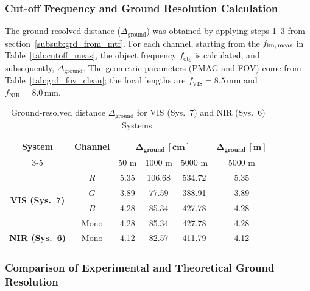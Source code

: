\subsubsection{Cut-off Frequency and Ground Resolution Calculation}
\label{subsub:grd_calc}
\noindent The ground-resolved distance ($\Delta_{\text{ground}}$) was obtained by applying steps 1–3 from section~\ref{subsub:grd_from_mtf}. For each channel, starting from the $f_{\text{im,\,meas}}$ in Table~\ref{tab:cutoff_meas}, the object frequency $f_{\text{obj}}$ is calculated, and subsequently, $\Delta_{\text{ground}}$. The geometric parameters (PMAG and FOV) come from Table~\ref{tab:grd_fov_clean}; the focal lengths are $f_{\text{VIS}} = 8.5\,\mathrm{mm}$ and $f_{\text{NIR}} = 8.0\,\mathrm{mm}$.\\

\begin{table}[H]
\centering
\caption{Ground-resolved distance $\Delta_{\text{ground}}$ for VIS (Sys.~7) and NIR (Sys.~6) Systems.}
\label{tab:grd_combined}
\begin{tabular}{|c|c|c|c|c|c|}
    \hline
    \rowcolor[HTML]{EFEFEF}
    \textbf{System} & \textbf{Channel} & \multicolumn{3}{c|}{$\mathbf{\Delta_{\text{ground}}\,[\text{cm}]}$} & $\mathbf{\Delta_{\text{ground}}\,[\text{m}]}$ \\ \cline{3-5}
    \rowcolor[HTML]{EFEFEF}
    & & 50 m & 1000 m & 5000 m & 5000 m \\ \hline
    \multirow{4}{*}{\textbf{VIS (Sys.~7)}} & $R$   & 5.35 & 106.68 & 534.72 & 5.35 \\ \cline{2-6}
                                         & $G$   & 3.89 &  77.59 & 388.91 & 3.89 \\ \cline{2-6}
                                         & $B$   & 4.28 &  85.34 & 427.78 & 4.28 \\ \cline{2-6}
                                         & Mono  & 4.28 &  85.34 & 427.78 & 4.28 \\ \hline
    \textbf{NIR (Sys.~6)} & Mono & 4.12 & 82.57 & 411.79 & 4.12 \\ \hline
\end{tabular}
\end{table}

\subsubsection{Comparison of Experimental and Theoretical Ground Resolution}
\label{subsub:grd_analysis_summary}


